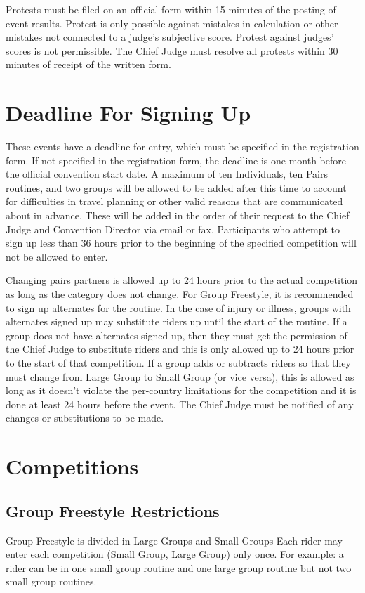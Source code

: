 Protests must be filed on an official form within 15 minutes of the posting of event results.
Protest is only possible against mistakes in calculation or other mistakes not connected to a judge's subjective score.
Protest against judges' scores is not permissible.
The Chief Judge must resolve all protests within 30 minutes of receipt of the written form.

\section{Deadline For Signing Up}

These events have a deadline for entry, which must be specified in the registration form.
If not specified in the registration form, the deadline is one month before the official convention start date.
A maximum of ten Individuals, ten Pairs routines, and two groups will be allowed to be added after this time to account for difficulties in travel planning or other valid reasons that are communicated about in advance. %
These will be added in the order of their request to the Chief Judge and Convention Director via email or fax.
Participants who attempt to sign up less than 36 hours prior to the beginning of the specified competition will not be allowed to enter.

Changing pairs partners is allowed up to 24 hours prior to the actual competition as long as the category does not change.
For Group Freestyle, it is recommended to sign up alternates for the routine.
In the case of injury or illness, groups with alternates signed up may substitute riders up until the start of the routine.
If a group does not have alternates signed up, then they must get the permission of the Chief Judge to substitute riders and this is only allowed up to 24 hours prior to the start of that competition.
If a group adds or subtracts riders so that they must change from Large Group to Small Group (or vice versa), this is allowed as long as it doesn't violate the per-country limitations for the competition and it is done at least 24 hours before the event.
The Chief Judge must be notified of any changes or substitutions to be made.

\section{Competitions}

\subsection{Group Freestyle Restrictions}
Group Freestyle is divided in Large Groups and Small Groups
Each rider may enter each competition (Small Group, Large Group) only once.
For example: a rider can be in one small group routine and one large group routine but not two small group routines.


